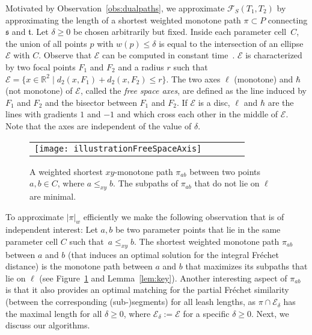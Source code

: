 \documentclass[a4paper,11pt]{article}
\begin{document}
	Motivated by Observation~\ref{obs:dualpaths}, we approximate $\mathcal{F}_S(T_1,T_2)$ by approximating the length of a shortest weighted monotone path $\pi \subset P$ connecting $\mathfrak{s}$ and $\mathfrak{t}$. 
	Let $\delta \geq 0$ be chosen arbitrarily but fixed. Inside each parameter cell~$C$, the union of all points $p$ with $w(p) \leq \delta$ is equal to the intersection of an ellipse $\mathcal{E}$ with $C$.  Observe that $\mathcal{E}$ can be computed in constant time~\cite{alt:computing}. $\mathcal{E}$ is characterized by two focal points $F_1$ and $F_2$ and a radius $r$ such that $\mathcal{E} = \{ x \in \mathbb{R}^2 \mid d_2 (x,F_1) + d_2 (x,F_2) \leq r \}$. The two axes $\ell$ (monotone) and $\hbar$ (not monotone) of $\mathcal{E}$, called the \emph{free space axes}, are defined as the line induced by $F_1$ and $F_2$ and the bisector between $F_1$ and $F_2$. If $\mathcal{E}$ is a disc, $\ell$ and $\hbar$ are the lines with gradients $1$ and $-1$ and which cross each other in the middle of $\mathcal{E}$. Note that the axes are independent of the value of $\delta$. 
	
\begin{figure}[ht]
  \begin{center}
    \begin{tabular}{ccccc}
      \texttt{[image: illustrationFreeSpaceAxis]} & &\\
\end{tabular}
  \end{center}
  \vspace*{-12pt}
  \caption{A weighted shortest $xy$-monotone path $\pi_{ab}$ between two points $a,b \in C$, where $a \leq_{xy} b$. The subpaths of  $\pi_{ab}$ that do not lie on $\ell$ are minimal.}
  \label{fig:shortestVSaxis}
\end{figure}	
	
	To approximate $|\pi|_w$ efficiently we make the following observation that is of independent interest: Let $a,b$ be two parameter points that lie in the same parameter cell $C$ such that~$a \leq_{xy} b$. The shortest weighted monotone path $\pi_{ab}$ between $a$ and $b$ (that induces an optimal solution for the integral Fr\'{e}chet distance) is the monotone path between $a$ and $b$ that maximizes its subpaths that lie on $\ell$  (see Figure~\ref{fig:shortestVSaxis} and Lemma~\ref{lem:key}). Another interesting aspect of $\pi_{ab}$ is that it also provides an optimal matching for the partial Fr\'{e}chet similarity (between the corresponding (sub-)segments) for all leash lengths,  as $\pi \cap \mathcal{E}_{\delta}$ has the maximal length for all $\delta \geq 0$, where $\mathcal{E}_{\delta} := \mathcal{E}$ for a specific $\delta \geq 0$. Next, we discuss our algorithms.
	
\end{document}
